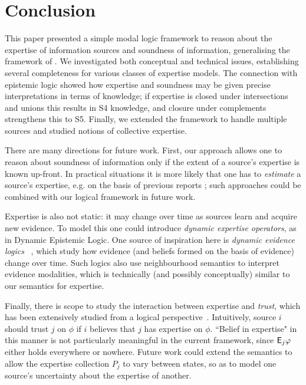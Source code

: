 \section{Conclusion}
\label{sec_conclusion}

This paper presented a simple modal logic framework to reason about the
expertise of information sources and soundness of information, generalising the
framework of \citet{singleton2021logic}. We investigated both conceptual and
technical issues, establishing several completeness for various classes of
expertise models. The connection with epistemic logic showed how expertise and
soundness may be given precise interpretations in terms of knowledge; if
expertise is closed under intersections and unions this results in S4
knowledge, and closure under complements strengthens this to S5. Finally, we
extended the framework to handle multiple sources and studied notions of
collective expertise.

There are many directions for future work.
%
First, our approach allows one to reason about soundness of information
only if the extent of a source's expertise is known up-front. In practical
situations it is more likely that one has to \emph{estimate} a source's
expertise, e.g. on the basis of previous reports
\citep{hunter_building_2021,dastani2004inferring}; such approaches could be
combined with our logical framework in future work.

Expertise is also not static: it may change over time as sources learn and
acquire new evidence. To model this one could introduce \emph{dynamic expertise
operators}, as in Dynamic Epistemic Logic. One
source of inspiration here is \emph{dynamic evidence logics}
~\citep{van2011dynamic,vanbenthem2014106}, which study how evidence (and
beliefs formed on the basis of evidence) change over time. Such logics also use
neighbourhood semantics to interpret evidence modalities, which is technically
(and possibly conceptually) similar to our semantics for expertise.

Finally, there is scope to study the interaction between
expertise and \emph{trust}, which has been extensively studied from a logical
perspective~\citep{booth_trust_2018,Liau_2003,lorini2014trust,herzig2010logic}.
Intuitively, source $i$ should trust $j$ on $\phi$ if $i$ believes that $j$ has
expertise on $\phi$. ``Belief in expertise" in this manner is not particularly
meaningful in the current framework, since $\mathsf{E}_j\varphi$ either holds everywhere
or nowhere. Future work could extend the semantics to allow the expertise
collection $P_j$ to vary between states, so as to model one source's
uncertainty about the expertise of another.
